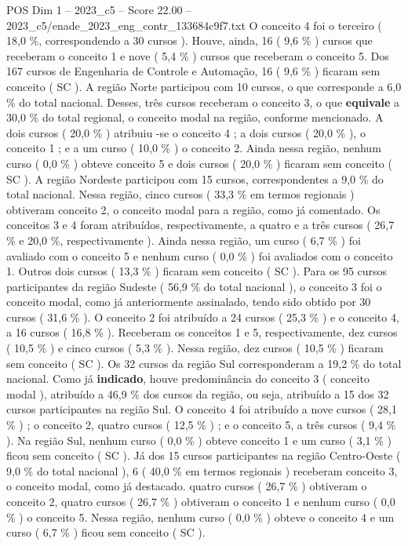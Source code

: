 \begin{textsample}{POS Dim 1 – 2023\_c5 – Score 22.00 – 2023\_c5/enade\_2023\_eng\_contr\_133684c9f7.txt}
O conceito 4 foi o terceiro ( 18,0 \%, correspondendo a 30 cursos ).
Houve, ainda, 16 ( 9,6 \% ) cursos que receberam o conceito 1 e nove ( 5,4 \% ) cursos que receberam o conceito 5.
Dos 167 cursos de Engenharia de Controle e Automação, 16 ( 9,6 \% ) ficaram sem conceito ( SC ).
A região Norte participou com 10 cursos, o que corresponde a 6,0 \% do total nacional.
Desses, três cursos receberam o conceito 3, o que \textbf{equivale} a 30,0 \% do total regional, o conceito modal na região, conforme mencionado.
A dois cursos ( 20,0 \% ) atribuiu -se o conceito 4 ; a dois cursos ( 20,0 \% ), o conceito 1 ; e a um curso ( 10,0 \% ) o conceito 2.
Ainda nessa região, nenhum curso ( 0,0 \% ) obteve conceito 5 e dois cursos ( 20,0 \% ) ficaram sem conceito ( SC ).
A região Nordeste participou com 15 cursos, correspondentes a 9,0 \% do total nacional.
Nessa região, cinco cursos ( 33,3 \% em termos regionais ) obtiveram conceito 2, o conceito modal para a região, como já comentado.
Os conceitos 3 e 4 foram atribuídos, respectivamente, a quatro e a três cursos ( 26,7 \% e 20,0 \%, respectivamente ).
Ainda nessa região, um curso ( 6,7 \% ) foi avaliado com o conceito 5 e nenhum curso ( 0,0 \% ) foi avaliados com o conceito 1.
Outros dois cursos ( 13,3 \% ) ficaram sem conceito ( SC ).
Para os 95 cursos participantes da região Sudeste ( 56,9 \% do total nacional ), o conceito 3 foi o conceito modal, como já anteriormente assinalado, tendo sido obtido por 30 cursos ( 31,6 \% ).
O conceito 2 foi atribuído a 24 cursos ( 25,3 \% ) e o conceito 4, a 16 cursos ( 16,8 \% ).
Receberam os conceitos 1 e 5, respectivamente, dez cursos ( 10,5 \% ) e cinco cursos ( 5,3 \% ).
Nessa região, dez cursos ( 10,5 \% ) ficaram sem conceito ( SC ).
Os 32 cursos da região Sul corresponderam a 19,2 \% do total nacional.
Como já \textbf{indicado}, houve predominância do conceito 3 ( conceito modal ), atribuído a 46,9 \% dos cursos da região, ou seja, atribuído a 15 dos 32 cursos participantes na região Sul.
O conceito 4 foi atribuído a nove cursos ( 28,1 \% ) ; o conceito 2, quatro cursos ( 12,5 \% ) ; e o conceito 5, a três cursos ( 9,4 \% ).
Na região Sul, nenhum curso ( 0,0 \% ) obteve conceito 1 e um curso ( 3,1 \% ) ficou sem conceito ( SC ).
Já dos 15 cursos participantes na região Centro-Oeste ( 9,0 \% do total nacional ), 6 ( 40,0 \% em termos regionais ) receberam conceito 3, o conceito modal, como já destacado. quatro cursos ( 26,7 \% ) obtiveram o conceito 2, quatro cursos ( 26,7 \% ) obtiveram o conceito 1 e nenhum curso ( 0,0 \% ) o conceito 5.
Nessa região, nenhum curso ( 0,0 \% ) obteve o conceito 4 e um curso ( 6,7 \% ) ficou sem conceito ( SC ).

\end{textsample}
